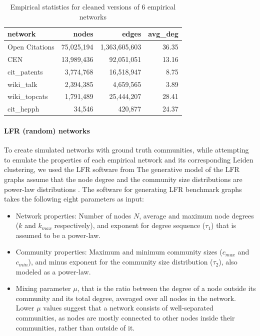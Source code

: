 \documentclass[11pt]{article}   	%
\begin{document}
\begin{table}[ht]
\centering
\begin{tabular}{lrrr}
  \hline
 network & nodes & edges & avg\_deg \\
  \hline
  Open Citations &   75,025,194 & 1,363,605,603  &  36.35 \\
  CEN &  13,989,436 &  92,051,051 & 13.16\\ 
  cit\_patents &   3,774,768 & 16,518,947 &   8.75 \\
  wiki\_talk &   2,394,385 & 4,659,565 & 3.89 \\
  wiki\_topcats &   1,791,489 &  25,444,207 & 28.41 \\
  cit\_hepph &   34,546 & 420,877 & 24.37 \\
   \hline
\end{tabular}
\caption{Empirical statistics for cleaned versions of 6 empirical networks}
\label{tab:empirical-stats-all}
\end{table}

\paragraph{LFR (random) networks}

To create simulated networks with ground truth communities, while attempting to emulate the properties of each empirical network and its corresponding Leiden clustering, we used the LFR software from \cite{lancichinetti2008benchmark}  The generative model of the LFR graphs assume that the node degree and the community size distributions are power-law distributions  \citep{albert2002statistical}.
The software for generating LFR benchmark graphs \citep{fortunato-resources} 
takes the following eight parameters as input:
\begin{itemize}
    \item  Network properties: Number of nodes $N$, average and maximum node degrees ($k$ and $k_{max}$ respectively), and exponent for degree sequence ($\tau_1$) that is assumed to be a power-law.
    \item Community properties: Maximum and minimum community sizes ($c_{max}$ and $c_{min}$), and minus exponent for the community size distribution ($\tau_2$), also modeled as a power-law.
    \item Mixing parameter $\mu$, that is the ratio between the degree of a node outside its community and its total degree, averaged over all nodes in the network. Lower $\mu$ values suggest that a network consists of well-separated communities, as nodes are mostly connected to other nodes inside their communities, rather than outside of it.
\end{itemize}
\end{document}
